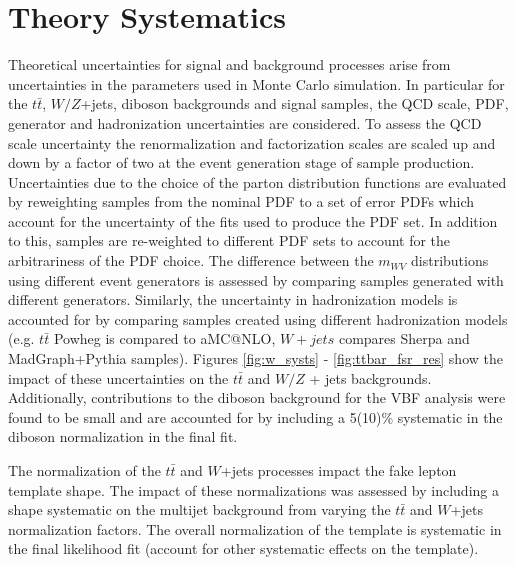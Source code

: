 \section{Theory Systematics}
Theoretical uncertainties for signal and background processes arise from uncertainties in the parameters used in Monte Carlo simulation. In particular for the $t\bar{t}$, $W/Z$+jets, diboson backgrounds and signal samples, the QCD scale, PDF, generator and hadronization uncertainties are considered. To assess the QCD scale uncertainty the renormalization and factorization scales are scaled up and down by a factor of two at the event generation stage of sample production. Uncertainties due to the choice of the parton distribution functions are evaluated by reweighting samples from the nominal PDF to a set of error PDFs which account for the uncertainty of the fits used to produce the PDF set. In addition to this, samples are re-weighted to different PDF sets to account for the arbitrariness of the PDF choice. The difference between the $m_{WV}$ distributions using different event generators is assessed by comparing samples generated with different generators. Similarly, the uncertainty in hadronization models is accounted for by comparing samples created using different hadronization models (e.g. $t\bar{t}$ Powheg is compared to aMC@NLO, $W+jets$ compares Sherpa and MadGraph+Pythia samples). Figures \ref{fig:w_systs} - \ref{fig:ttbar_fsr_res} show the impact of these uncertainties on the $t\bar{t}$ and $W/Z$ + jets backgrounds. Additionally, contributions to the diboson background for the VBF analysis were found to be small and are accounted for by including a 5(10)\% systematic in the diboson normalization in the final fit.

The normalization of the $t\bar{t}$ and $W$+jets processes impact the fake lepton template shape. The impact of these normalizations was assessed by including a shape systematic on the multijet background from varying the $t\bar{t}$ and $W$+jets normalization factors. The overall normalization of the template is systematic in the final likelihood fit (account for other systematic effects on the template).



